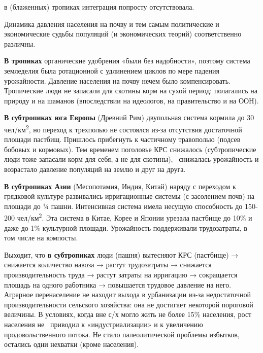 \documentclass[twoside,a4paper]{article}
\begin{document}
{
в (блаженных) тропиках интеграция попросту отсутствовала.}

{
Динамика давления населения на почву и тем самым политические и экономические судьбы популяций (и экономических теорий)
соответственно различны.}

{
\textbf{В тропиках} органические удобрения «были без надобности», поэтому система земледелия была ротационной с
удлинением циклов по мере падения урожайности. Давление населения на почву нечем было компенсировать. Тропические люди
не запасали для скотины корм на сухой период: полагались на природу и на шаманов (впоследствии на идеологов, на
правительство и на ООН).}

{
\textbf{В субтропиках юга Европы} (Древний Рим) двупольная система кормила до 30 чел/км\textsuperscript{2}, но переход к
трехполью не состоялся из-за отсутствия достаточной площади пастбищ. Пришлось прибегнуть к частичному травополью
(подсев бобовых и кормовых). Тем временем поголовье КРС снижалось (субтропические люди тоже запасали корм для себя, а
не для скотины), \ снижалась урожайность и возрастало давление популяций на землю и друг на друга. }

{
\textbf{В субтропиках Азии} (Месопотамия, Индия, Китай) наряду с переходом к грядковой культуре развивались
ирригационные системы (с засолением почв) на площади до ¼ пашни. Интенсивная система имела несущую способность до
150-200 чел/км\textsuperscript{2}. Эта система в Китае, Корее и Японии урезала пастбище до 10\% и даже до 1\%
культурной площади. Урожайность поддерживали трудозатраты, в том числе на компосты.}

{
Выходит, что \textbf{в субтропиках} люди (пашня) вытесняют КРС (пастбище) → снижается количество навоза → растут
трудозатраты → снижается производительность труда → растут затраты на ирригацию → сокращается площадь на одного
работника → повышается трудовое давление на него. Аграрное перенаселение не находит выхода в урбанизации из-за
недостаточной производительности сельского хозяйства: она не достигает некоторой пороговой величины. В условиях, когда
вне с/х могло жить не более 15\% населения, рост населения не \ приводил к «индустриализации» и к увеличению
продовольственного потока. Не стало палеолитической проблемы избытков, остались одни нехватки (кроме населения).}
\end{document}
